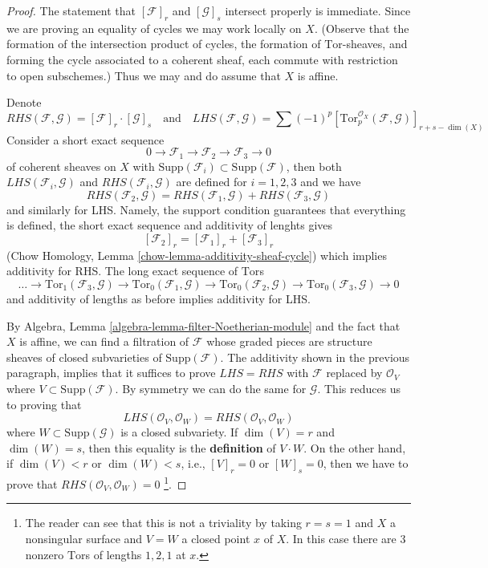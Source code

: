\begin{proof}
The statement that $[\mathcal{F}]_r$ and $[\mathcal{G}]_s$ intersect properly
is immediate. Since we are proving an equality of cycles we may work
locally on $X$. (Observe that the formation of the intersection
product of cycles, the formation of $\text{Tor}$-sheaves, and
forming the cycle associated to a coherent sheaf, each commute with
restriction to open subschemes.) Thus we may and do assume that $X$ is affine.

\medskip\noindent
Denote
$$
RHS(\mathcal{F}, \mathcal{G}) = [\mathcal{F}]_r \cdot [\mathcal{G}]_s
\quad\text{and}\quad
LHS(\mathcal{F}, \mathcal{G}) = \sum (-1)^p
[\text{Tor}_p^{\mathcal{O}_X}(\mathcal{F}, \mathcal{G})]_{r + s - \dim(X)}
$$
Consider a short exact sequence
$$
0 \to \mathcal{F}_1 \to \mathcal{F}_2 \to \mathcal{F}_3 \to 0
$$
of coherent sheaves on $X$ with
$\text{Supp}(\mathcal{F}_i) \subset \text{Supp}(\mathcal{F})$,
then both $LHS(\mathcal{F}_i, \mathcal{G})$ and
$RHS(\mathcal{F}_i, \mathcal{G})$ are defined for $i = 1, 2, 3$
and we have
$$
RHS(\mathcal{F}_2, \mathcal{G}) =
RHS(\mathcal{F}_1, \mathcal{G}) + RHS(\mathcal{F}_3, \mathcal{G})
$$
and similarly for LHS. Namely, the support condition guarantees that
everything is defined, the short exact sequence and additivity of lenghts
gives
$$
[\mathcal{F}_2]_r = [\mathcal{F}_1]_r  + [\mathcal{F}_3]_r
$$
(Chow Homology, Lemma \ref{chow-lemma-additivity-sheaf-cycle})
which implies additivity for RHS. The long exact sequence of $\text{Tor}$s
$$
\ldots \to \text{Tor}_1(\mathcal{F}_3, \mathcal{G}) \to
\text{Tor}_0(\mathcal{F}_1, \mathcal{G}) \to
\text{Tor}_0(\mathcal{F}_2, \mathcal{G}) \to
\text{Tor}_0(\mathcal{F}_3, \mathcal{G}) \to 0
$$
and additivity of lengths as before implies additivity for LHS.

\medskip\noindent
By Algebra, Lemma \ref{algebra-lemma-filter-Noetherian-module}
and the fact that $X$ is affine, we can find a filtration of $\mathcal{F}$
whose graded pieces are structure sheaves of closed subvarieties of
$\text{Supp}(\mathcal{F})$. The additivity shown in the previous paragraph,
implies that it suffices to prove $LHS = RHS$ with
$\mathcal{F}$ replaced by $\mathcal{O}_V$ where
$V \subset \text{Supp}(\mathcal{F})$.
By symmetry we can do the same for $\mathcal{G}$.
This reduces us to proving that
$$
LHS(\mathcal{O}_V, \mathcal{O}_W) = RHS(\mathcal{O}_V, \mathcal{O}_W)
$$
where $W \subset \text{Supp}(\mathcal{G})$ is a closed subvariety.
If $\dim(V) = r$ and $\dim(W) = s$, then this equality is the
{\bf definition} of $V \cdot W$. On the other hand, if
$\dim(V) < r$ or $\dim(W) < s$, i.e., $[V]_r = 0$ or $[W]_s = 0$,
then we have to prove that $RHS(\mathcal{O}_V, \mathcal{O}_W) = 0$
\footnote{The reader can see that this is not a triviality by
taking $r = s = 1$ and $X$ a nonsingular surface and $V = W$
a closed point $x$ of $X$. In this case there are $3$ nonzero
$\text{Tor}$s of lengths $1, 2, 1$ at $x$.}.


\end{proof}
